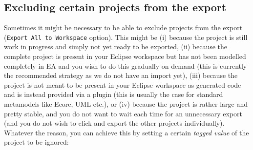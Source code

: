 \subsection{Excluding certain projects from the export}

Sometimes it might be necessary to be able to exclude projects from the export (\texttt{Export All to Workspace} option).
This might be (i) because the project is still work in progress and simply not yet ready to be exported, (ii) because the complete project is present in your
Eclipse workspace but has not been modelled completely in EA and you wish to do this gradually on demand (this is currently the recommended strategy as we do
not have an import yet), (iii) because the project is not meant to be present in your Eclipse workspace as generated code and is instead provided via a plugin
(this is usually the case for standard metamodels like Ecore, UML etc.), or (iv) because the project is rather large and pretty stable, and you do not want to
wait each time for an unnecessary export (and you do not wish to click and export the other projects individually).
Whatever the reason, you can achieve this by setting a certain \emph{tagged value} of the project to be ignored:

